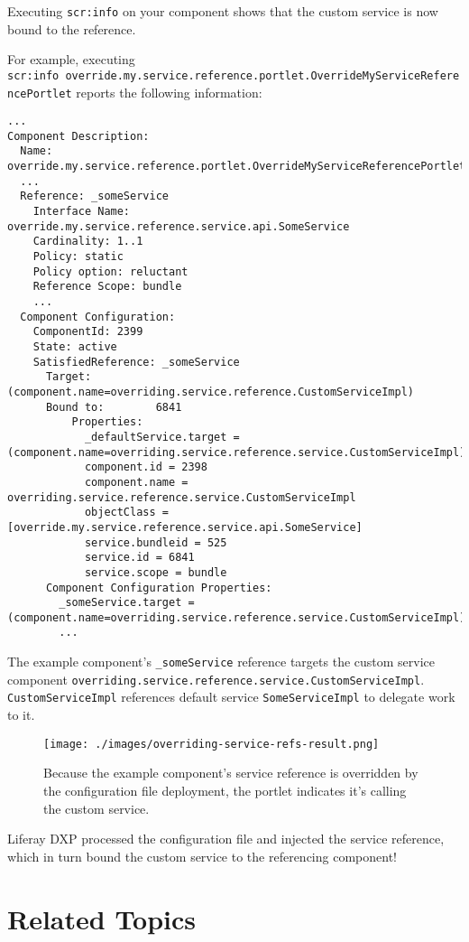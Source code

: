 Executing \texttt{scr:info} on your component shows that the custom
service is now bound to the reference.

For example, executing
\texttt{scr:info\ override.my.service.reference.portlet.OverrideMyServiceReferencePortlet}
reports the following information:

\begin{verbatim}
...
Component Description:
  Name: override.my.service.reference.portlet.OverrideMyServiceReferencePortlet
  ...
  Reference: _someService
    Interface Name: override.my.service.reference.service.api.SomeService
    Cardinality: 1..1
    Policy: static
    Policy option: reluctant
    Reference Scope: bundle
    ...
  Component Configuration:
    ComponentId: 2399
    State: active
    SatisfiedReference: _someService
      Target: (component.name=overriding.service.reference.CustomServiceImpl)
      Bound to:        6841
          Properties:
            _defaultService.target = (component.name=overriding.service.reference.service.CustomServiceImpl)
            component.id = 2398
            component.name = overriding.service.reference.service.CustomServiceImpl
            objectClass = [override.my.service.reference.service.api.SomeService]
            service.bundleid = 525
            service.id = 6841
            service.scope = bundle
      Component Configuration Properties:
        _someService.target = (component.name=overriding.service.reference.service.CustomServiceImpl)
        ...
\end{verbatim}

The example component's \texttt{\_someService} reference targets the
custom service component
\texttt{overriding.service.reference.service.CustomServiceImpl}.
\texttt{CustomServiceImpl} references default service
\texttt{SomeServiceImpl} to delegate work to it.

\begin{figure}
\centering
\texttt{[image: ./images/overriding-service-refs-result.png]}
\caption{Because the example component's service reference is overridden
by the configuration file deployment, the portlet indicates it's calling
the custom service.}
\end{figure}

Liferay DXP processed the configuration file and injected the service
reference, which in turn bound the custom service to the referencing
component!

\section{Related Topics}\label{related-topics-33}

